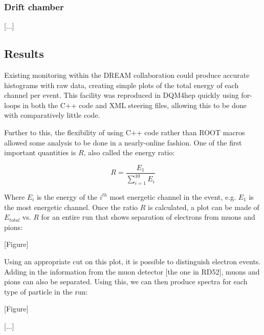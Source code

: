 \subsubsection{Drift chamber}
[...]

\subsection{Results}
Existing monitoring within the DREAM collaboration could produce accurate histograms with raw data, creating simple plots of the total energy of each channel per event. This facility was reproduced in DQM4hep quickly using for-loops in both the C++ code and XML steering files, allowing this to be done with comparatively little code.

Further to this, the flexibility of using C++ code rather than ROOT macros allowed some analysis to be done in a nearly-online fashion. One of the first important quantities is $R$, also called the energy ratio:

\begin{displaymath}
	R = \frac{E_1}{\sum_{i=1}^{10} E_i}
\end{displaymath}

Where $E_i$ is the energy of the $i^{th}$ most energetic channel in the event, e.g. $E_1$ is the most energetic channel. Once the ratio $R$ is calculated, a plot can be made of $E_{total}$ vs. $R$ for an entire run that shows separation of electrons from muons and pions:

\begin{center}
	[Figure]
\end{center}

Using an appropriate cut on this plot, it is possible to distinguish electron events. Adding in the information from the muon detector [the one in RD52], muons and pions can also be separated. Using this, we can then produce spectra for each type of particle in the run:

\begin{center}
	[Figure]
\end{center}

[...]
